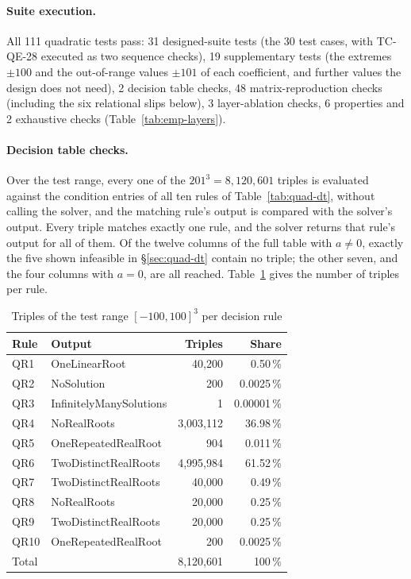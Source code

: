 \documentclass[11pt,a4paper]{article}
\begin{document}
\paragraph{Suite execution.} All 111 quadratic tests pass: 31 designed-suite
tests (the 30 test cases, with TC-QE-28 executed as two sequence checks), 19
supplementary tests (the extremes \(\pm100\) and the out-of-range values
\(\pm101\) of each coefficient, and further values the design does not
need), 2 decision table checks, 48 matrix-reproduction checks (including the six relational slips below), 3
layer-ablation checks, 6 properties and 2 exhaustive checks
(Table~\ref{tab:emp-layers}).

\paragraph{Decision table checks.} Over the test range, every one of the
\(201^3=8{,}120{,}601\) triples is evaluated against the condition entries of
all ten rules of Table~\ref{tab:quad-dt}, without calling the solver, and the
matching rule's output is compared with the solver's output. Every triple
matches exactly one rule, and the solver returns that rule's output for all
of them. Of the twelve columns of the full table with \(a\ne0\), exactly the
five shown infeasible in \S\ref{sec:quad-dt} contain no triple; the other
seven, and the four columns with \(a=0\), are all reached.
Table~\ref{tab:quad-rule-counts} gives the number of triples per rule.

\begin{table}[H]
\centering
\caption{Triples of the test range \([-100,100]^3\) per decision rule}
\label{tab:quad-rule-counts}
\small
\begin{tabular}{l l r r}
\toprule
Rule & Output & Triples & Share \\
\midrule
QR1 & OneLinearRoot & 40{,}200 & 0.50\,\% \\
QR2 & NoSolution & 200 & 0.0025\,\% \\
QR3 & InfinitelyManySolutions & 1 & 0.00001\,\% \\
QR4 & NoRealRoots & 3{,}003{,}112 & 36.98\,\% \\
QR5 & OneRepeatedRealRoot & 904 & 0.011\,\% \\
QR6 & TwoDistinctRealRoots & 4{,}995{,}984 & 61.52\,\% \\
QR7 & TwoDistinctRealRoots & 40{,}000 & 0.49\,\% \\
QR8 & NoRealRoots & 20{,}000 & 0.25\,\% \\
QR9 & TwoDistinctRealRoots & 20{,}000 & 0.25\,\% \\
QR10 & OneRepeatedRealRoot & 200 & 0.0025\,\% \\
\midrule
Total & & 8{,}120{,}601 & 100\,\% \\
\bottomrule
\end{tabular}
\end{table}
\end{document}
